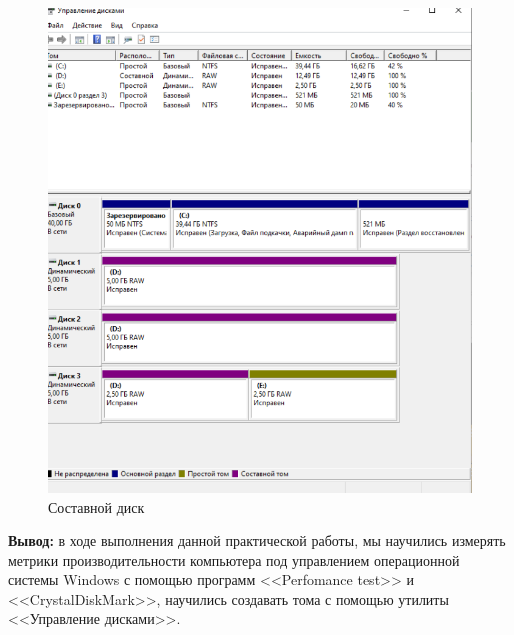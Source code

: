 \documentclass[a4paper,14pt]{extarticle}
\begin{document}
\begin{figure}[h]
\begin{center}
\begin{minipage}[h]{0.48\linewidth}
			\includegraphics[width=1\linewidth]{images/gforg}
			\caption{Составной диск}
			\label{ris:jbod}
		\end{minipage}
	\end{center}
\end{figure}


\textbf{Вывод:} в ходе выполнения данной практической работы, мы научились измерять метрики производительности компьютера под управлением операционной системы Windows с помощью программ <<Perfomance test>> и <<CrystalDiskMark>>, научились создавать тома с помощью утилиты <<Управление дисками>>.
\end{document}
